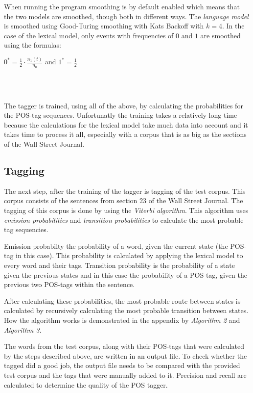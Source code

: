\documentclass[10pt, a4paper]{article}
\begin{document}
When running the program smoothing is by default enabled which means that the two models are smoothed, though both in different ways. The \textit{language model} is smoothed using Good-Turing smoothing with Kats Backoff with $k = 4$. In the case of the lexical model, only events with frequencies of $0$ and $1$ are smoothed using the formulas:\\

\centerline{$0^* = \frac{1}{2} \cdot \frac{n_1 (t)}{n_0}$ and $1^* = \frac{1}{2}$}\\\

The tagger is trained, using all of the above, by calculating the probabilities for the POS-tag sequences. Unfortunatly the training takes a relatively long time because the calculations for the lexical model take much data into account and it takes time to process it all, especially with a corpus that is as big as the sections of the Wall Street Journal.

\subsection*{Tagging}
The next step, after the training of the tagger is tagging of the test corpus. This corpus consists of the sentences from section 23 of the Wall Street Journal. The tagging of this corpus is done by using the \textit{Viterbi algorithm}. This algorithm uses \textit{emission probabilities} and \textit{transition probabilities} to calculate the most probable tag sequencies. 

Emission probabilty the probability of a word, given the current state (the POS-tag in this case). This probability is calculated by applying the lexical model to every word and their tags. Transition probability is the probability of a state given the previous states and in this case the probability of a POS-tag, given the previous two POS-tags within the sentence.

After calculating these probabilities, the most probable route between states is calculated by recursively calculating the most probable transition between states. How the algorithm works is demonstrated in the appendix by \textit{Algorithm 2} and \textit{Algorithm 3}.

The words from the test corpus, along with their POS-tags that were calculated by the steps described above, are written in an output file. To check whether the tagged did a good job, the output file needs to be compared with the provided test corpus and the tags that were manually added to it. Precision and recall are calculated to determine the quality of the POS tagger.
\end{document}
